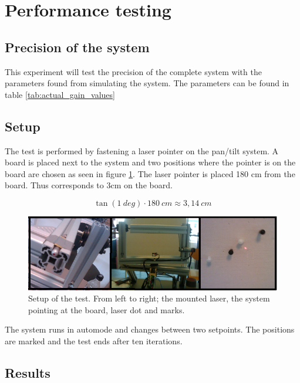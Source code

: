\section{Performance testing}

\subsection{Precision of the system}\label{subsec:precisionofsystem}
This experiment will test the precision of the complete system with the
parameters found from simulating the system. The parameters can be found in
table \ref{tab:actual_gain_values}

\subsection*{Setup}

The test is performed by fastening a laser pointer on the pan/tilt system. A
board is placed next to the system and two positions where the pointer is on the
board are chosen as seen in figure \ref{fig:systemtestsetup}. The laser pointer is placed 180 cm
from the board. Thus corresponds to 3cm on the board.

\[ \tan(1 \ deg) \cdot 180 \ cm \approx 3,14 \ cm \]


\begin{figure}[htb] \centering \includegraphics[width=\textwidth,trim=0 0 0
0]{graphics/overallsystemtest.png} %
	\caption{Setup of the test. From left to right; the mounted laser, the system pointing at the board, laser dot and marks.}
	\label{fig:systemtestsetup}			%
\end{figure}

The system runs in automode and changes between two setpoints. The positions
are marked and the test ends after ten iterations. 

\subsection*{Results}

